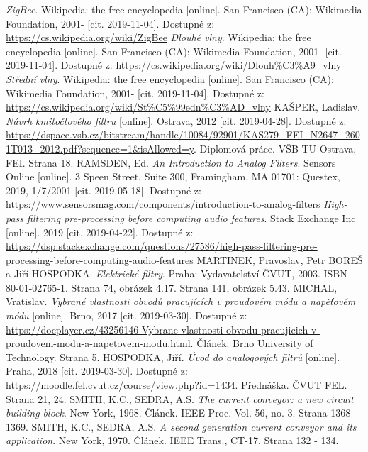 \newpage
\begin{thebibliography}{999}
\textit{ZigBee}. Wikipedia: the free encyclopedia [online]. San Francisco (CA): Wikimedia Foundation, 2001- [cit. 2019-11-04]. Dostupné z: \url{https://cs.wikipedia.org/wiki/ZigBee}
\textit{Dlouhé vlny}. Wikipedia: the free encyclopedia [online]. San Francisco (CA): Wikimedia Foundation, 2001- [cit. 2019-11-04]. Dostupné z: \url{https://cs.wikipedia.org/wiki/Dlouh%C3%A9_vlny}
\textit{Střední vlny}. Wikipedia: the free encyclopedia [online]. San Francisco (CA): Wikimedia Foundation, 2001- [cit. 2019-11-04]. Dostupné z: \url{https://cs.wikipedia.org/wiki/St%C5%99edn%C3%AD_vlny}
KAŠPER, Ladislav. \textit{Návrh kmitočtového filtru} [online]. Ostrava, 2012 [cit. 2019-04-28]. Dostupné z: \url{https://dspace.vsb.cz/bitstream/handle/10084/92901/KAS279_FEI_N2647_2601T013_2012.pdf?sequence=1&isAllowed=y}. Diplomová práce. VŠB-TU Ostrava, FEI. Strana 18.
RAMSDEN, Ed. \textit{An Introduction to Analog Filters}. Sensors Online [online]. 3 Speen Street, Suite 300, Framingham, MA 01701: Questex, 2019, 1/7/2001 [cit. 2019-05-18]. Dostupné z: \url{https://www.sensorsmag.com/components/introduction-to-analog-filters}
\textit{High-pass filtering pre-processing before computing audio features}. Stack Exchange Inc [online]. 2019 [cit. 2019-04-22]. Dostupné z: \url{https://dsp.stackexchange.com/questions/27586/high-pass-filtering-pre-processing-before-computing-audio-features}
MARTINEK, Pravoslav, Petr BOREŠ a Jiří HOSPODKA. \textit{Elektrické filtry}. Praha: Vydavatelství ČVUT, 2003. ISBN 80-01-02765-1. Strana 74, obrázek 4.17. Strana 141, obrázek 5.43.
MICHAL, Vratislav. \textit{Vybrané vlastnosti obvodů pracujících v proudovém módu a napěťovém módu} [online]. Brno, 2017 [cit. 2019-03-30]. Dostupné z: \url{https://docplayer.cz/43256146-Vybrane-vlastnosti-obvodu-pracujicich-v-proudovem-modu-a-napetovem-modu.html}. Článek. Brno University of Technology. Strana 5.
HOSPODKA, Jiří. \textit{Úvod do analogových filtrů} [online]. Praha, 2018 [cit. 2019-03-30]. Dostupné z: \url{https://moodle.fel.cvut.cz/course/view.php?id=1434}. Přednáška. ČVUT FEL. Strana 21, 24.
SMITH, K.C., SEDRA, A.S. \textit{The current conveyor: a new circuit building block}. New York, 1968. Článek. IEEE Proc. Vol. 56, no. 3. Strana 1368 - 1369.
SMITH, K.C., SEDRA, A.S. \textit{A second generation current conveyor and its application}. New York, 1970. Článek. IEEE Trans., CT-17. Strana 132 - 134.

\end{thebibliography}
